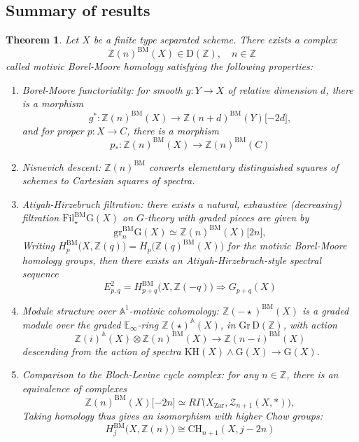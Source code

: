 \documentclass[11pt, twoside]{article}
\numberwithin{equation}{section}
\newtheorem{theorem}[equation]{Theorem}
\theoremstyle{definition}
\newcommand{\bb}[1]{\mathbb{#1}}
\newcommand{\fil}{\mathrm{Fil}}
\newcommand{\gr}{\mathrm{gr}}
\newcommand{\bm}{\mathrm{BM}}
\newcommand{\G}{\mathrm{G}}
\newcommand{\KH}{\mathrm{KH}}
\begin{document}
\subsection{Summary of results} 
\begin{theorem}\label{main-intro} Let \(X\) be a finite type separated scheme. There exists a complex 
\[\bb{Z}(n)^\bm(X) \in \mathrm{D}(\bb{Z}), \quad n \in \bb{Z}\]
called \emph{motivic Borel-Moore homology} satisfying the following properties: 
\begin{enumerate}
\item Borel-Moore functoriality: for smooth \(g \colon Y \to X\) of relative dimension \(d\), there is a morphism 
\[g^* \colon \bb{Z}(n)^\bm(X) \to \bb{Z}(n + d)^\bm(Y)\lbrack-2d \rbrack,\]
and for proper \(p \colon X \to C\), there is a morphism 
\[p_* \colon \bb{Z}(n)^\bm(X) \to \bb{Z}(n)^\bm(C)\]

\item Nisnevich descent: \(\bb{Z}(n)^\bm\) converts elementary distinguished squares of schemes to Cartesian squares of spectra.

\item Atiyah-Hirzebruch filtration: there exists a natural, exhaustive (decreasing) filtration \(\fil_\star^\bm \G(X)\) on \(G\)-theory with graded pieces are given by 
\[\gr_n^\bm \G(X) \simeq \bb{Z}(n)^\bm(X)\lbrack 2n \rbrack,\]
Writing \(H_p^\bm \big(X, \bb{Z}(q)\big) = H_p \big(\bb{Z}(q)^\bm(X)\big)\) for the \emph{motivic Borel-Moore homology groups}, then there exists an Atiyah-Hirzebruch-style spectral sequence 
\[E_{p, q}^2 = H_{p + q}^\bm\big(X, \bb{Z}(- q)\big) \Longrightarrow G_{p + q}(X)\]

\item Module structure over \(\bb{A}^1\)-motivic cohomology: \(\bb{Z}(- \star)^\bm(X)\) is a graded module over the graded \(\bb{E}_\infty\)-ring \(\bb{Z}(\star)^\bb{A}(X)\), in \(\mathrm{Gr} \, \mathrm{D}(\bb{Z})\), with action 
\[\bb{Z}(i)^\bb{A}(X) \otimes \bb{Z}(n)^\bm(X) \to \bb{Z}(n - i)^\bm(X)\]
descending from the action of spectra \(\KH(X) \wedge \G(X) \to \G(X)\).

\item Comparison to the Bloch-Levine cycle complex: for any \(n \in \bb{Z}\), there is an equivalence of complexes 
\[\bb{Z}(n)^\bm(X)\lbrack -2n \rbrack \simeq R\Gamma(X_\mathrm{Zar}, \mathcal{Z}_{n + 1}(X, *)\big),\]
Taking homology thus gives an isomorphism with higher Chow groups: 
\[H_j^\bm\big(X, \bb{Z}(n)\big) \cong \mathrm{CH}_{n + 1}(X, j - 2n)\]

\end{enumerate}
\end{theorem}
\end{document}
